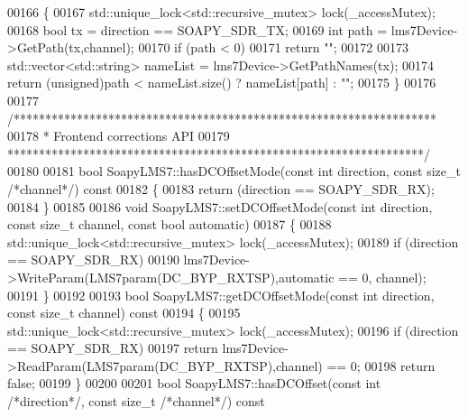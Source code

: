 \begin{DoxyCode}
{{{{{{00166 \textcolor{keyword}{}\{
00167     std::unique\_lock<std::recursive\_mutex> lock(_accessMutex);
00168     \textcolor{keywordtype}{bool} tx = direction == SOAPY\_SDR\_TX;
00169     \textcolor{keywordtype}{int} path = lms7Device->GetPath(tx,channel);
00170     \textcolor{keywordflow}{if} (path < 0)
00171         \textcolor{keywordflow}{return} \textcolor{stringliteral}{""};
00172    
00173     std::vector<std::string> nameList = lms7Device->GetPathNames(tx);
00174     \textcolor{keywordflow}{return} (\textcolor{keywordtype}{unsigned})path < nameList.size() ? nameList[path] : \textcolor{stringliteral}{""};
00175 \}
00176 
00177 \textcolor{comment}{/*******************************************************************}
00178 \textcolor{comment}{ * Frontend corrections API}
00179 \textcolor{comment}{ ******************************************************************/}
00180 
00181 \textcolor{keywordtype}{bool} SoapyLMS7::hasDCOffsetMode(\textcolor{keyword}{const} \textcolor{keywordtype}{int} direction, \textcolor{keyword}{const} \textcolor{keywordtype}{size\_t} \textcolor{comment}{/*channel*/})\textcolor{keyword}{ const}
00182 \textcolor{keyword}{}\{
00183     \textcolor{keywordflow}{return} (direction == SOAPY\_SDR\_RX);
00184 \}
00185 
00186 \textcolor{keywordtype}{void} SoapyLMS7::setDCOffsetMode(\textcolor{keyword}{const} \textcolor{keywordtype}{int} direction, \textcolor{keyword}{const} \textcolor{keywordtype}{size\_t} channel, \textcolor{keyword}{const} \textcolor{keywordtype}{bool} automatic)
00187 \{
00188     std::unique\_lock<std::recursive\_mutex> lock(_accessMutex);
00189     \textcolor{keywordflow}{if} (direction == SOAPY\_SDR\_RX)
00190         lms7Device->WriteParam(LMS7param(DC_BYP_RXTSP),automatic == 0, channel);
00191 \}
00192 
00193 \textcolor{keywordtype}{bool} SoapyLMS7::getDCOffsetMode(\textcolor{keyword}{const} \textcolor{keywordtype}{int} direction, \textcolor{keyword}{const} \textcolor{keywordtype}{size\_t} channel)\textcolor{keyword}{ const}
00194 \textcolor{keyword}{}\{
00195     std::unique\_lock<std::recursive\_mutex> lock(_accessMutex); 
00196     \textcolor{keywordflow}{if} (direction == SOAPY\_SDR\_RX)
00197         \textcolor{keywordflow}{return} lms7Device->ReadParam(LMS7param(DC_BYP_RXTSP),channel) == 0;
00198     \textcolor{keywordflow}{return} \textcolor{keyword}{false};
00199 \}
00200 
00201 \textcolor{keywordtype}{bool} SoapyLMS7::hasDCOffset(\textcolor{keyword}{const} \textcolor{keywordtype}{int} \textcolor{comment}{/*direction*/}, \textcolor{keyword}{const} \textcolor{keywordtype}{size\_t} \textcolor{comment}{/*channel*/})\textcolor{keyword}{ const}
}}}}}}
\end{DoxyCode}
